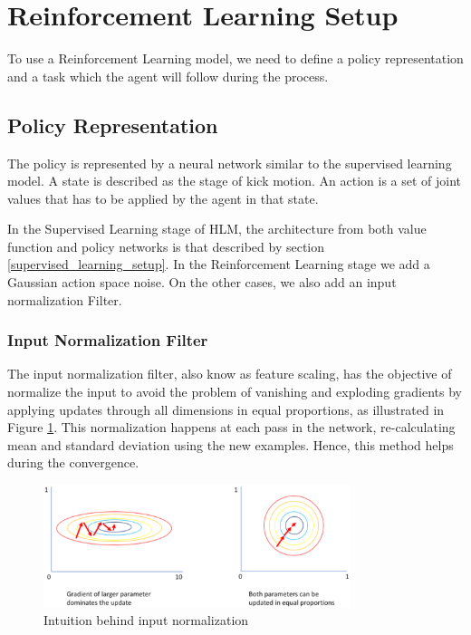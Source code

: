 \section{Reinforcement Learning Setup}

To use a Reinforcement Learning model, we need to define a policy representation and a task which the agent will follow during the process.

\subsection{Policy Representation}

The policy is represented by a neural network similar to the supervised learning model. A state is described as the stage of kick motion. An action is a set of joint values that has to be applied by the agent in that state.

In the Supervised Learning stage of HLM, the architecture from both value function and policy networks is that described by section \ref{supervised_learning_setup}. In the Reinforcement Learning stage we add a Gaussian action space noise. On the other cases, we also add an input normalization Filter.

\subsubsection{Input Normalization Filter}\label{sec:inputnorm}
The input normalization filter, also know as feature scaling, has the objective of normalize the input to avoid the problem of vanishing and exploding gradients by applying updates through all dimensions in equal proportions, as illustrated in Figure \ref{inputnormfig}. This normalization happens at each pass in the network, re-calculating mean and standard deviation using the new examples. Hence, this method helps during the convergence.

\begin{figure}[!htbp]
	\centering
	\includegraphics[width=0.8\textwidth]{Cap5/inputnorm.eps}
	\caption{Intuition behind input normalization}
	\label{inputnormfig}
\end{figure}

